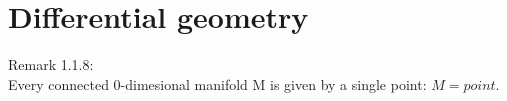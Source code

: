\def\topic{}

\section{Differential geometry}
Remark 1.1.8:\\
Every connected 0-dimesional manifold M is given by a single point: $M={point}$.
